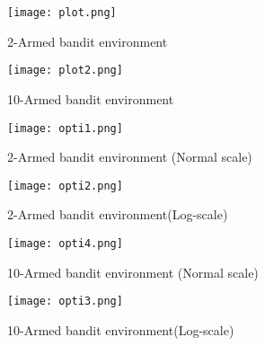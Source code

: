 \documentclass[a4 paper]{article}
\begin{document}
\begin{enumerate}
\begin{figure}[h!]
    \centering
    \texttt{[image: plot.png]}
    \caption{ 2-Armed bandit environment}
\end{figure}


\begin{figure}[h!]
    \centering
    \texttt{[image: plot2.png]}
    \caption{10-Armed bandit environment}
\end{figure}
 
 \begin{figure}[h!]
    \centering
    \texttt{[image: opti1.png]}
    \caption{ 2-Armed bandit environment (Normal scale)}
\end{figure}

\begin{figure}[h!]
    \centering
    \texttt{[image: opti2.png]}
    \caption{ 2-Armed bandit environment(Log-scale)}
\end{figure}
 
 \begin{figure}[h!]
    \centering
    \texttt{[image: opti4.png]}
    \caption{ 10-Armed bandit environment (Normal scale)}
\end{figure}

\begin{figure}[h!]
    \centering
    \texttt{[image: opti3.png]}
    \caption{ 10-Armed bandit environment(Log-scale)}
\end{figure}
 
\end{enumerate}
\end{document}
